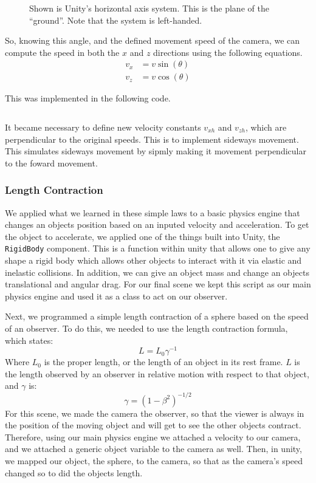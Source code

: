 \documentclass[12pt]{article}
\begin{document}
\begin{figure}[h]
  \centering
  
  \caption{Shown is Unity's horizontal axis system. This is the plane of the \enquote{ground}. Note that the system is left-handed.}
\end{figure}

So, knowing this angle, and the defined movement speed of the camera, we can compute the speed in both the $x$ and $z$ directions using the following equations.
\begin{align}
v_x &= v \sin(\theta) \\
v_z &= v \cos(\theta)
\end{align}

This was implemented in the following code.
\inputminted[firstline=12,lastline=29,linenos,fontsize=\footnotesize,bgcolor=codebg]{csharp}{../unity/Assets/Scripts/Engine/FreeCamera.cs}

It became necessary to define new velocity constants $v_\mathit{xh}$ and $v_\mathit{zh}$, which are perpendicular to the original speeds. This is to implement sideways movement. This simulates sideways movement by sipmly making it movement perpendicular to the foward movement.


\subsubsection{Length Contraction}
We applied what we learned in these simple laws to a basic physics engine that changes an objects position based on an inputed velocity and acceleration. To get the object to accelerate, we applied one of the things built into Unity, the \texttt{RigidBody} component. This is a function within unity that allows one to give any shape a rigid body which allows other objects to interact with it via elastic and inelastic collisions. In addition, we can give an object mass and change an objects translational and angular drag. For our final scene we kept this script as our main physics engine and used it as a class to act on our observer. 

Next, we programmed a simple length contraction of a sphere based on the speed of an observer. To do this, we needed to use the length contraction formula, which states:
\begin{equation}
L = L_0\gamma^{-1}
\end{equation}
Where $L_0$ is the proper length, or the length of an object in its rest frame. $L$ is the length observed by an observer in relative motion with respect to that object, and $\gamma$ is:
\begin{equation}
\gamma = (1-\beta^2)^{-1/2}
\end{equation}
For this scene, we made the camera the observer, so that the viewer is always in the position of the moving object and will get to see the other objects contract. Therefore, using our main physics engine we attached a velocity to our camera, and we attached a generic object variable to the camera as well. Then, in unity, we mapped our object, the sphere, to the camera, so that as the camera's speed changed so to did the objects length.
\end{document}
